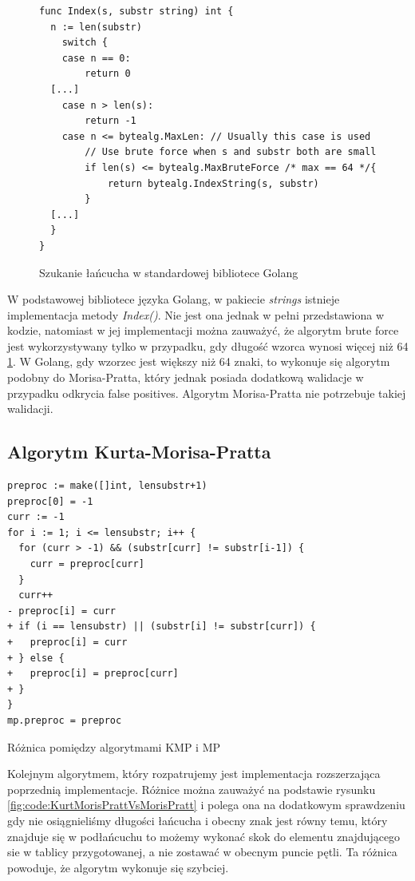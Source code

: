 \begin{figure}[h]
  \centering
  \begin{lstlisting}
func Index(s, substr string) int {
  n := len(substr)
	switch {
	case n == 0:
		return 0
  [...]
	case n > len(s):
		return -1
	case n <= bytealg.MaxLen: // Usually this case is used
		// Use brute force when s and substr both are small
		if len(s) <= bytealg.MaxBruteForce /* max == 64 */{
			return bytealg.IndexString(s, substr)
		}
  [...]
  }
}
  \end{lstlisting}
  \caption{ Szukanie łańcucha w standardowej bibliotece Golang }
  \label{fig:code:golangSearchInsideString}
\end{figure}

W podstawowej bibliotece języka Golang, w pakiecie \textit{strings} istnieje 
implementacja metody \textit{Index()}. Nie jest ona jednak w pełni przedstawiona
w kodzie, natomiast w jej implementacji można zauważyć, że algorytm brute force
jest wykorzystywany tylko w przypadku, gdy długość wzorca wynosi więcej niż 64 
\ref{fig:code:golangSearchInsideString}. W Golang, gdy wzorzec jest większy niż
64 znaki, to wykonuje się algorytm podobny do Morisa-Pratta, który jednak 
posiada dodatkową walidacje w przypadku odkrycia false positives. 
Algorytm Morisa-Pratta nie potrzebuje takiej walidacji.


\subsection{Algorytm Kurta-Morisa-Pratta}

\begin{listing}[H]
    \begin{verbatim}
preproc := make([]int, lensubstr+1)
preproc[0] = -1
curr := -1
for i := 1; i <= lensubstr; i++ {
  for (curr > -1) && (substr[curr] != substr[i-1]) {
    curr = preproc[curr]
  }
  curr++
- preproc[i] = curr
+ if (i == lensubstr) || (substr[i] != substr[curr]) {
+   preproc[i] = curr
+ } else {
+   preproc[i] = preproc[curr]
+ }
}
mp.preproc = preproc
    \end{verbatim}
  \caption{Różnica pomiędzy algorytmami KMP i MP}
  \label{fig:code:KurtMorisPrattVsMorisPratt}
\end{listing}

Kolejnym algorytmem, który rozpatrujemy jest implementacja rozszerzająca 
poprzednią implementacje. Różnice można zauważyć na podstawie rysunku
\ref{fig:code:KurtMorisPrattVsMorisPratt} i polega ona na dodatkowym sprawdzeniu
gdy nie osiągnieliśmy długości łańcucha i obecny znak jest równy temu, który 
znajduje się w podłańcuchu to możemy wykonać skok do elementu znajdującego
sie w tablicy przygotowanej, a nie zostawać w obecnym puncie pętli. Ta różnica
powoduje, że algorytm wykonuje się szybciej.

